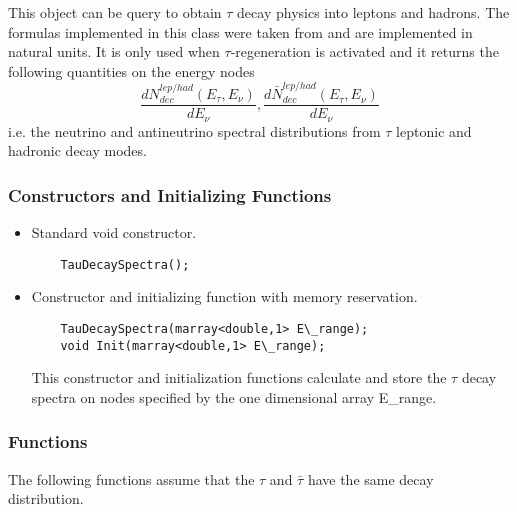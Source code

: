 This object can be query to obtain $\tau$ decay physics into leptons and hadrons. The formulas implemented in this class were taken from \citep{Dutta:2000jv} and are implemented in natural units. It is only used when $\tau$-regeneration is activated and it returns the following quantities on the energy nodes
\begin{equation}
\frac{dN^{lep/had}_{dec} (E_\tau, E_\nu)}{dE_\nu} , \frac{d\bar{N}^{lep/had}_{dec} (E_\tau, E_\nu)}{dE_\nu} 
\label{eqn:tau-dist}
\end{equation}
i.e. the neutrino and antineutrino spectral distributions from $\tau$ leptonic and hadronic decay modes.

\subsubsection{Constructors and Initializing Functions}

\begin{itemize}
\item Standard void constructor.
  \begin{lstlisting}
    TauDecaySpectra();
  \end{lstlisting}
\item Constructor and initializing function with memory reservation.
  \begin{lstlisting}
    TauDecaySpectra(marray<double,1> E\_range);
    void Init(marray<double,1> E\_range);
  \end{lstlisting}
This constructor and initialization functions calculate and store the $\tau$ decay spectra on nodes specified by the one dimensional array {\ttf E\_range}.
\end{itemize}

\subsubsection{Functions}

The following functions assume that the $\tau$ and $\bar{\tau}$ have the same decay distribution.

